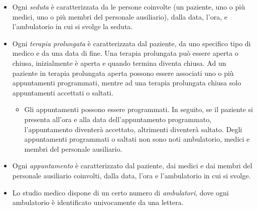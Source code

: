 \documentclass[11pt,a4paper]{article}
\begin{document}
\begin{itemize}
\begin{itemize}
    \end{itemize}
    \item Ogni \emph{seduta} è caratterizzata da le persone coinvolte (un paziente, uno o più medici, uno o più membri del personale ausiliario), dalla data, l’ora, e l’ambulatorio in cui si svolge la seduta.
    \item Ogni \emph{terapia prolungata} è caratterizzata dal paziente, da uno specifico tipo di medico e da una data di fine. Una terapia prolungata può essere aperta o chiusa, inizialmente è aperta e quando termina diventa chiusa. Ad un paziente in terapia prolungata aperta possono essere associati uno o più appuntamenti programmati, mentre ad una terapia prolungata chiusa solo appuntamenti accettati o saltati.
    \begin{itemize}
        \item Gli appuntamenti possono essere programmati. In seguito, se il paziente si presenta all’ora e alla data dell’appuntamento programmato, l’appuntamento diventerà accettato, altrimenti diventerà saltato. Degli appuntamenti programmati o saltati non sono noti ambulatorio, medici e membri del personale ausiliario.
    \end{itemize}
    \item Ogni \emph{appuntamento} è caratterizzato dal paziente, dai medici e dai membri del personale ausiliario coinvolti, dalla data, l’ora e l’ambulatorio in cui si svolge.
    \item Lo studio medico dispone di un certo numero di \emph{ambulatori}, dove ogni ambulatorio è identificato univocamente da una lettera.
\end{itemize}
\end{document}
